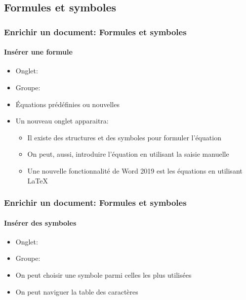 \documentclass[xcolor=table]{beamer}
\begin{document}
\subsection{Formules et symboles}

\begin{frame}
\frametitle{Enrichir un document: Formules et symboles}
\framesubtitle{Insérer une formule}


\begin{minipage}{0.76\textwidth}
\begin{itemize}
	\item Onglet: 
	\item Groupe: 
	\item \'Equations prédéfinies ou nouvelles
	\item Un nouveau onglet apparaitra: 
	\begin{itemize}
		\item Il existe des structures et des symboles pour formuler l'équation 
		\item On peut, aussi, introduire l'équation en utilisant la saisie manuelle
		\item Une nouvelle fonctionnalité de Word 2019 est les équations en utilisant \LaTeX
	\end{itemize}
\end{itemize}
\end{minipage}
\begin{minipage}{0.23\textwidth}
		
\end{minipage}

\end{frame}

\begin{frame}
\frametitle{Enrichir un document: Formules et symboles}
\framesubtitle{Insérer des symboles}

\begin{minipage}{0.50\textwidth}
\begin{itemize}
	\item Onglet: 
	\item Groupe: 
	\item On peut choisir une symbole parmi celles les plus utilisées
	\item On peut naviguer la table des caractères
\end{itemize}
\end{minipage}
\begin{minipage}{0.49\textwidth}
	
\end{minipage}

\end{frame}
\end{document}
